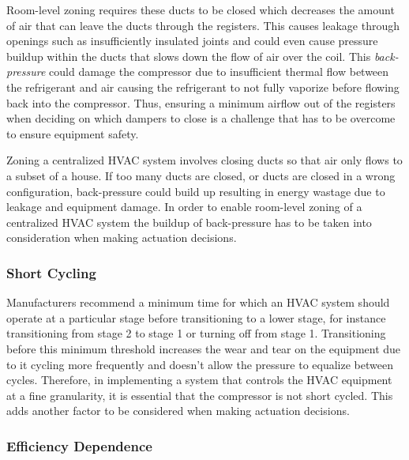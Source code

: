 Room-level zoning requires these ducts to be closed which decreases the amount
of air that can leave the ducts through the registers. This causes leakage
through openings such as insufficiently insulated joints and could even cause
pressure buildup within the ducts that slows down the flow of air over the
coil. This {\em back-pressure} could damage the compressor due to insufficient
thermal flow between the refrigerant and air causing the refrigerant to not
fully vaporize before flowing back into the compressor. Thus, ensuring a minimum
airflow out of the registers when deciding on which dampers to close is a
challenge that has to be overcome to ensure equipment safety.

Zoning a centralized HVAC system involves closing ducts so that air only flows
to a subset of a house. If too many ducts are closed, or ducts are closed in a
wrong configuration, back-pressure could build up resulting in energy wastage
due to leakage and equipment damage. In order to enable room-level zoning of a
centralized HVAC system the buildup of back-pressure has to be taken into
consideration when making actuation decisions.

\subsubsection{Short Cycling}
Manufacturers recommend a minimum time for which an HVAC system should operate
at a particular stage before transitioning to a lower stage, for instance
transitioning from stage 2 to stage 1 or turning off from stage 1. Transitioning
before this minimum threshold increases the wear and tear on the equipment due
to it cycling more frequently and doesn't allow the pressure to equalize between
cycles. Therefore, in implementing a system that controls the HVAC equipment at
a fine granularity, it is essential that the compressor is not short
cycled. This adds another factor to be considered when making actuation
decisions.


\subsubsection{Efficiency Dependence}
\label{sec:efficiencyDependence}

